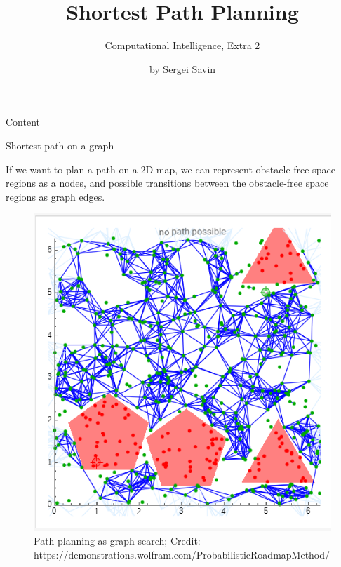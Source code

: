 \documentclass{beamer}
\title{Shortest Path Planning}
\subtitle{Computational Intelligence, Extra 2}
\author{by Sergei Savin}
\date{\mydate}
\begin{document}
\maketitle


\begin{frame}{Content}


\end{frame}



\begin{frame}{Shortest path on a graph}
	\begin{flushleft}
		
		If we want to plan a path on a 2D map, we can represent obstacle-free space regions as a nodes, and possible transitions between the obstacle-free space regions as graph edges. 
		
		\begin{figure}
			\centering
			\includegraphics[width=0.4\linewidth]{GraphPathPlanning}
			\caption{Path planning as graph search; \scriptsize{Credit: https://demonstrations.wolfram.com/ProbabilisticRoadmapMethod/}}
			\label{fig:graphpathplanning}
		\end{figure}
		
		
	\end{flushleft}
\end{frame}
\end{document}
